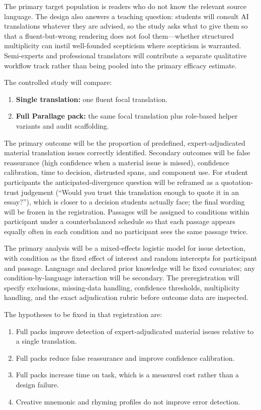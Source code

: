 \documentclass[
  12pt,
]{article}
\providecommand{\tightlist}{%
  \setlength{\itemsep}{0pt}\setlength{\parskip}{0pt}}
\begin{document}
The primary target population is readers who do not know the relevant
source language. The design also answers a teaching question: students
will consult AI translations whatever they are advised, so the study
asks what to give them so that a fluent-but-wrong rendering does not
fool them---whether structured multiplicity can instil well-founded
scepticism where scepticism is warranted. Semi-experts and professional
translators will
contribute a separate qualitative workflow track rather than being
pooled into the primary efficacy estimate.

The controlled study will compare:

\begin{enumerate}
\def\labelenumi{\arabic{enumi}.}
\tightlist
\item
  \textbf{Single translation:} one fluent focal translation.
\item
  \textbf{Full Parallage pack:} the same focal translation plus
  role-based helper variants and audit scaffolding.
\end{enumerate}

The primary outcome will be the proportion of predefined,
expert-adjudicated material translation issues correctly identified.
Secondary outcomes will be false reassurance (high confidence when a
material issue is missed), confidence calibration, time to decision,
distrusted spans, and component use. For student participants the
anticipated-divergence question will be reframed as a quotation-trust
judgement (``Would you trust this translation enough to quote it in an
essay?''), which is closer to a decision students actually face; the
final wording will be frozen in the registration. Passages will be
assigned to conditions within participant under a counterbalanced
schedule so that each passage appears equally often in each condition
and no participant sees the same passage twice.

The primary analysis will be a mixed-effects logistic model for issue
detection, with condition as the fixed effect of interest and random
intercepts for participant and passage. Language and declared prior
knowledge will be fixed covariates; any condition-by-language
interaction will be secondary. The preregistration will specify
exclusions, missing-data handling, confidence thresholds, multiplicity
handling, and the exact adjudication rubric before outcome data are
inspected.

The hypotheses to be fixed in that registration are:

\begin{enumerate}
\def\labelenumi{\arabic{enumi}.}
\tightlist
\item
  Full packs improve detection of expert-adjudicated material issues
  relative to a single translation.
\item
  Full packs reduce false reassurance and improve confidence
  calibration.
\item
  Full packs increase time on task, which is a measured cost rather than
  a design failure.
\item
  Creative mnemonic and rhyming profiles do not improve error detection.
\end{enumerate}
\end{document}
